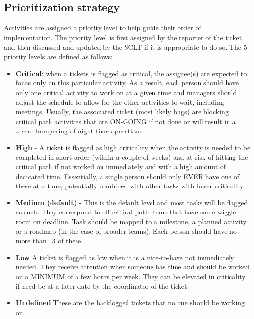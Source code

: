 \documentclass[SE,authoryear,toc]{lsstdoc}
\begin{document}
\subsection{Prioritization strategy}
Activities are assigned a priority level to help guide their order of implementation.
The priority level is first assigned by the reporter of the ticket and then discussed and updated by the SCLT if it is appropriate to do so.
The 5 priority levels are defined as follows:
\begin{itemize}
\item{\bf Critical}: when a tickets is flagged as critical, the assignee(s) are expected to focus only on this particular activity. 
As a result, each person should have only one critical activity to work on at a given time and managers should adjust the schedule to allow for the other activities to wait, including meetings. 
Usually, the associated ticket (most likely bugs) are blocking critical path activities that are ON-GOING if not done or will result in a severe hampering of night-time operations. 

\item{\bf High} - A ticket is flagged as high criticality when the activity is needed to be completed in short order (within a couple of weeks) and at risk of hitting the critical path if not worked on immediately and with a high amount of dedicated time. 
Essentially, a single person should only EVER have one of these at a time, potentially combined with other tasks with lower criticality. 

\item{\bf Medium (default)} - This is the default level and most tasks will be flagged as such. 
They correspond to off critical path items that have some wiggle room on deadline. 
Task should be mapped to a milestone, a planned activity or a roadmap (in the case of broader teams).  
Each person should have no more than ~3 of these.

\item{\bf Low} A ticket is flagged as low when it is a nice-to-have not immediately needed. 
They receive attention when someone has time and  should be worked on a MINIMUM of a few hours per week. 
They can be elevated in criticality if need be at a later date by the coordinator of the ticket.  

\item{\bf Undefined} These are the backlogged tickets that no one should be working on.
\end{itemize}
\end{document}
